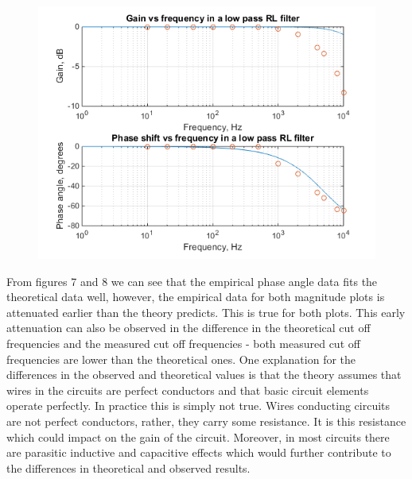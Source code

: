 \documentclass{article}
\begin{document}
\begin{center}
	\begin{figure}[H]
		\begin{minipage}{0.6\textwidth}
			\includegraphics[scale=0.8]{bode4}
		\end{minipage}
	\end{figure}
\end{center}

From figures 7 and 8 we can see that the empirical phase angle data fits the theoretical data well, however, the empirical data for both magnitude plots is attenuated earlier than the theory predicts. This is true for both plots. This early attenuation can also be observed in the difference in the theoretical cut off frequencies and the measured cut off frequencies - both measured cut off frequencies are lower than the theoretical ones. One explanation for the differences in the observed and theoretical values is that the theory assumes that wires in the circuits are perfect conductors and that basic circuit elements operate perfectly. In practice this is simply not true. Wires conducting circuits are not perfect conductors, rather, they carry some resistance. It is this resistance which could impact on the gain of the circuit. Moreover, in most circuits there are parasitic inductive and capacitive effects which would further contribute to the differences in theoretical and observed results.



\end{document}
